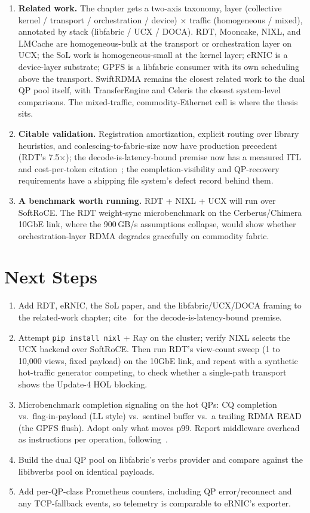 \documentclass[11pt,letterpaper]{article}
\begin{document}
\begin{enumerate}
\item \textbf{Related work.} The chapter gets a two-axis taxonomy, layer (collective kernel / transport / orchestration / device) $\times$ traffic (homogeneous / mixed), annotated by stack (libfabric / UCX / DOCA). RDT, Mooncake, NIXL, and LMCache are homogeneous-bulk at the transport or orchestration layer on UCX; the SoL work is homogeneous-small at the kernel layer; eRNIC is a device-layer substrate; GPFS is a libfabric consumer with its own scheduling above the transport. SwiftRDMA remains the closest related work to the dual QP pool itself, with TransferEngine and Celeris the closest system-level comparisons. The mixed-traffic, commodity-Ethernet cell is where the thesis sits.
\item \textbf{Citable validation.} Registration amortization, explicit routing over library heuristics, and coalescing-to-fabric-size now have production precedent (RDT's 7.5$\times$); the decode-is-latency-bound premise now has a measured ITL and cost-per-token citation~\cite{sol2026}; the completion-visibility and QP-recovery requirements have a shipping file system's defect record behind them.
\item \textbf{A benchmark worth running.} RDT + NIXL + UCX will run over SoftRoCE. The RDT weight-sync microbenchmark on the Cerberus/Chimera 10GbE link, where the 900\,GB/s assumptions collapse, would show whether orchestration-layer RDMA degrades gracefully on commodity fabric.
\end{enumerate}

\section{Next Steps}

\begin{enumerate}
\item Add RDT, eRNIC, the SoL paper, and the libfabric/UCX/DOCA framing to the related-work chapter; cite~\cite{sol2026} for the decode-is-latency-bound premise.
\item Attempt \texttt{pip install nixl} + Ray on the cluster; verify NIXL selects the UCX backend over SoftRoCE. Then run RDT's view-count sweep (1 to 10{,}000 views, fixed payload) on the 10GbE link, and repeat with a synthetic hot-traffic generator competing, to check whether a single-path transport shows the Update-4 HOL blocking.
\item Microbenchmark completion signaling on the hot QPs: CQ completion vs.\ flag-in-payload (LL style) vs.\ sentinel buffer vs.\ a trailing RDMA READ (the GPFS flush). Adopt only what moves p99. Report middleware overhead as instructions per operation, following~\cite{papadopoulou2017}.
\item Build the dual QP pool on libfabric's verbs provider and compare against the libibverbs pool on identical payloads.
\item Add per-QP-class Prometheus counters, including QP error/reconnect and any TCP-fallback events, so telemetry is comparable to eRNIC's exporter.
\end{enumerate}
\end{document}
